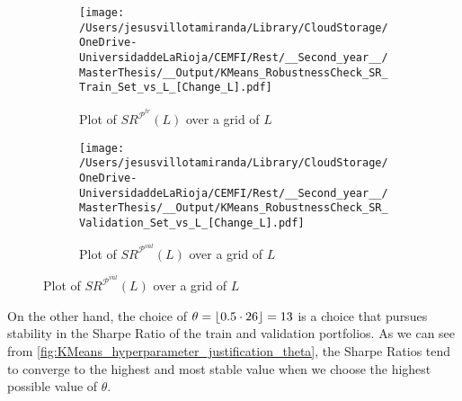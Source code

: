 \begin{figure}[H]
  \caption{Sharpe Ratios in the train and validation splits as a function of $L$}
  \centering
  
  \begin{subfigure}[b]{0.46\textwidth}
    \centering
    \texttt{[image: /Users/jesusvillotamiranda/Library/CloudStorage/OneDrive-UniversidaddeLaRioja/CEMFI/Rest/\_\_Second\_year\_\_/MasterThesis/\_\_Output/KMeans\_RobustnessCheck\_SR\_Train\_Set\_vs\_L\_[Change\_L].pdf]}
    \caption{Plot of $SR^{\mathcal P^{tr}}(L)$ over a grid of $L$}
    \label{fig:K_hyp_1}
  \end{subfigure}
  \hspace{0.05\textwidth} %
  \begin{subfigure}[b]{0.46\textwidth}
    \centering
    \texttt{[image: /Users/jesusvillotamiranda/Library/CloudStorage/OneDrive-UniversidaddeLaRioja/CEMFI/Rest/\_\_Second\_year\_\_/MasterThesis/\_\_Output/KMeans\_RobustnessCheck\_SR\_Validation\_Set\_vs\_L\_[Change\_L].pdf]}
    \caption{Plot of $SR^{\mathcal P^{val}}(L)$ over a grid of $L$}
    \label{fig:K_hyp_2}
  \end{subfigure}  
  \label{fig:KMeans_hyperparameter_justification_L}
\end{figure}

On the other hand, the choice of $\theta=\lfloor 0.5\cdot 26 \rfloor=13$ is a choice that pursues stability in the Sharpe Ratio of the train and validation portfolios. As we can see from \cref{fig:KMeans_hyperparameter_justification_theta}, the Sharpe Ratios tend to converge to the highest and most stable value when we choose the highest possible value of $\theta$. 

